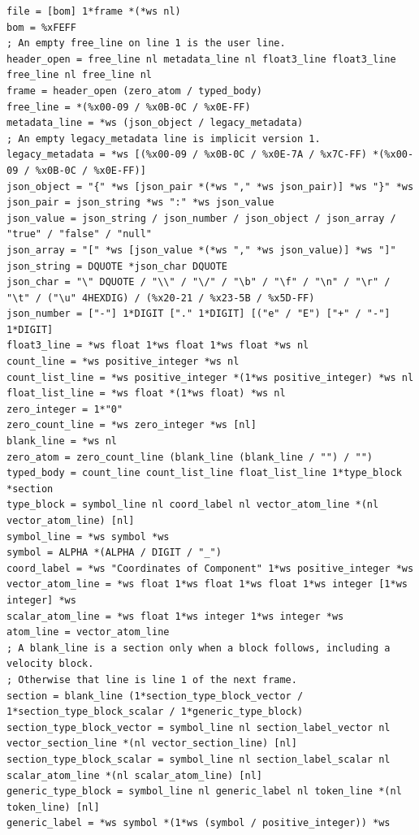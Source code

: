 \begin{lstlisting}[caption={Non-normative ABNF for one frame.},label={lst:abnf}]
file = [bom] 1*frame *(*ws nl)
bom = %xFEFF
; An empty free_line on line 1 is the user line.
header_open = free_line nl metadata_line nl float3_line float3_line free_line nl free_line nl
frame = header_open (zero_atom / typed_body)
free_line = *(%x00-09 / %x0B-0C / %x0E-FF)
metadata_line = *ws (json_object / legacy_metadata)
; An empty legacy_metadata line is implicit version 1.
legacy_metadata = *ws [(%x00-09 / %x0B-0C / %x0E-7A / %x7C-FF) *(%x00-09 / %x0B-0C / %x0E-FF)]
json_object = "{" *ws [json_pair *(*ws "," *ws json_pair)] *ws "}" *ws
json_pair = json_string *ws ":" *ws json_value
json_value = json_string / json_number / json_object / json_array / "true" / "false" / "null"
json_array = "[" *ws [json_value *(*ws "," *ws json_value)] *ws "]"
json_string = DQUOTE *json_char DQUOTE
json_char = "\" DQUOTE / "\\" / "\/" / "\b" / "\f" / "\n" / "\r" / "\t" / ("\u" 4HEXDIG) / (%x20-21 / %x23-5B / %x5D-FF)
json_number = ["-"] 1*DIGIT ["." 1*DIGIT] [("e" / "E") ["+" / "-"] 1*DIGIT]
float3_line = *ws float 1*ws float 1*ws float *ws nl
count_line = *ws positive_integer *ws nl
count_list_line = *ws positive_integer *(1*ws positive_integer) *ws nl
float_list_line = *ws float *(1*ws float) *ws nl
zero_integer = 1*"0"
zero_count_line = *ws zero_integer *ws [nl]
blank_line = *ws nl
zero_atom = zero_count_line (blank_line (blank_line / "") / "")
typed_body = count_line count_list_line float_list_line 1*type_block *section
type_block = symbol_line nl coord_label nl vector_atom_line *(nl vector_atom_line) [nl]
symbol_line = *ws symbol *ws
symbol = ALPHA *(ALPHA / DIGIT / "_")
coord_label = *ws "Coordinates of Component" 1*ws positive_integer *ws
vector_atom_line = *ws float 1*ws float 1*ws float 1*ws integer [1*ws integer] *ws
scalar_atom_line = *ws float 1*ws integer 1*ws integer *ws
atom_line = vector_atom_line
; A blank_line is a section only when a block follows, including a velocity block.
; Otherwise that line is line 1 of the next frame.
section = blank_line (1*section_type_block_vector / 1*section_type_block_scalar / 1*generic_type_block)
section_type_block_vector = symbol_line nl section_label_vector nl vector_section_line *(nl vector_section_line) [nl]
section_type_block_scalar = symbol_line nl section_label_scalar nl scalar_atom_line *(nl scalar_atom_line) [nl]
generic_type_block = symbol_line nl generic_label nl token_line *(nl token_line) [nl]
generic_label = *ws symbol *(1*ws (symbol / positive_integer)) *ws

\end{lstlisting}
